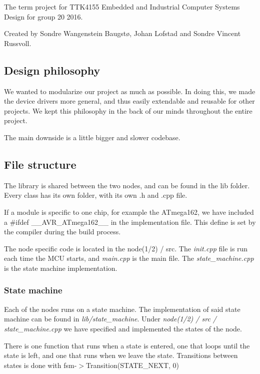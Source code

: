 The term project for T\+T\+K4155 Embedded and Industrial Computer Systems Design for group 20 2016.

Created by Sondre Wangenstein Baugstø, Johan Lofstad and Sondre Vincent Russvoll.

\subsection*{Design philosophy}

We wanted to modularize our project as much as possible. In doing this, we made the device drivers more general, and thus easily extendable and reusable for other projects. We kept this philosophy in the back of our minds throughout the entire project.

The main downside is a little bigger and slower codebase.

\subsection*{File structure}

The library is shared between the two nodes, and can be found in the lib folder. Every class has its own folder, with its own .h and .cpp file.

If a module is specific to one chip, for example the A\+Tmega162, we have included a {\ttfamily \#ifdef \+\_\+\+\_\+\+A\+V\+R\+\_\+\+A\+Tmega162\+\_\+\+\_\+} in the implementation file. This define is set by the compiler during the build process.

The node specific code is located in the node(1/2) / src. The {\itshape init.\+cpp} file is run each time the M\+CU starts, and {\itshape main.\+cpp} is the main file. The {\itshape state\+\_\+machine.\+cpp} is the state machine implementation.

\subsubsection*{State machine}

Each of the nodes runs on a state machine. The implementation of said state machine can be found in {\itshape lib/state\+\_\+machine}. Under {\itshape node(1/2) / src / state\+\_\+machine.\+cpp} we have specified and implemented the states of the node.

There is one function that runs when a state is entered, one that loops until the state is left, and one that runs when we leave the state. Transitions between states is done with {\ttfamily fsm-\/$>$Transition(\+S\+T\+A\+T\+E\+\_\+\+N\+E\+X\+T, 0)}

